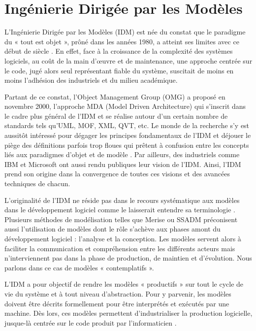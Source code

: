 \section{Ingénierie Dirigée par les Modèles}

L'Ingénierie Dirigée par les Modèles (IDM) est née du constat que le paradigme 
du « tout est objet », prôné dans les années 1980, a atteint ses limites avec ce 
début de siècle \cite{greenfield2004software}. En effet, face à la croissance de 
la complexité des systèmes logiciels, au coût de la main d'œuvre et de 
maintenance, une approche centrée sur le code, jugé alors seul représentant 
fiable du système, suscitait de moins en moins l'adhésion des industriels et du 
milieu académique. 

Partant de ce constat, l'Object Management Group (OMG) a proposé en novembre 
2000, l'approche MDA (Model Driven Architecture) qui s'inscrit dans le cadre 
plus général de l'IDM et se réalise autour d'un certain nombre de standards tels 
qu'UML, MOF, XML, QVT, etc. Le monde de la recherche s'y est aussitôt intéressé 
pour dégager les principes fondamentaux de l'IDM 
\cite{bezivin2001towards}\cite{kent2002model} \cite{de2002using} et déjouer le 
piège des définitions parfois trop floues qui prêtent à confusion entre les 
concepts liés aux paradigmes d'objet et de modèle \cite{bezivin2004search}. Par 
ailleurs, des industriels comme IBM \cite{booch2004mda} et Microsoft 
\cite{greenfield2004software} ont aussi rendu publiques leur vision de l'IDM. 
Ainsi, l'IDM prend son origine dans la convergence de toutes ces visions et des 
avancées techniques de chacun.

L'originalité de l'IDM ne réside pas dans le recours systématique aux modèles 
dans le développement logiciel comme le laisserait entendre sa terminologie  
\cite{bezivin2004rapport}. Plusieurs méthodes de modélisation telles que Merise 
ou SSADM préconisent aussi l'utilisation de modèles dont le rôle s'achève aux 
phases amont du développement logiciel : l'analyse et la conception. Les modèles 
servent alors à faciliter la communication et compréhension entre les différents 
acteurs mais n'interviennent pas dans la phase de production, de maintien et 
d'évolution. Nous parlons dans ce cas de modèles « contemplatifs ». 

L'IDM a pour objectif de rendre les modèles « productifs » sur tout le cycle de 
vie du système et à tout niveau d'abstraction. Pour y parvenir, les modèles 
doivent être décrits formellement pour être interprétés et exécutés par une 
machine. Dès lors, ces modèles permettent d'industrialiser la production 
logicielle, jusque-là centrée sur le code produit par l'informaticien 
\cite{bezivin2005unification}.

